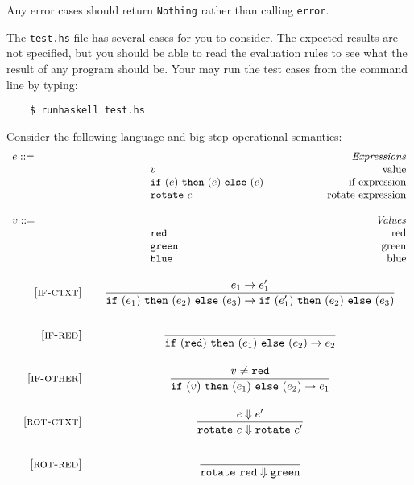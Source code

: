 \documentclass[addpoints]{exam}
\begin{document}
\begin{questions}
Any error cases should return {\tt Nothing} rather than calling {\tt error}.

The {\tt test.hs} file has several cases for you to consider.
The expected results are not specified,
but you should be able to read the evaluation rules to see
what the result of any program should be.
Your may run the test cases from the command line by typing:

\begin{verbatim}
    $ runhaskell test.hs
\end{verbatim}

\eject

  \question[15]

\newcommand{\rval}{\mbox{\tt red}}
\newcommand{\gval}{\mbox{\tt green}}
\newcommand{\bval}{\mbox{\tt blue}}
\newcommand{\rot}[1]{\mbox{\tt rotate}~{#1}}
\newcommand{\ife}[3]{\mbox{\tt if}~({#1})~{\tt then}~({#2})~{\tt else}~({#3})}

Consider the following language and big-step operational semantics:
\[
  \begin{array}{ll@{\qquad\qquad\qquad}r}
  \mydefhead{e ::=}{Expressions}
  \mydefcase{v}{value}
  \mydefcase{\ife e e e}{if expression}
  \mydefcase{\rot e}{rotate expression}
  \\
  \mydefhead{v ::=\qquad\qquad\qquad\qquad}{Values}
  \mydefcase{\rval}{red}
  \mydefcase{\gval}{green}
  \mydefcase{\bval}{blue}
\end{array}
\]

\[
  \begin{array}{r@{\qquad}c}

    \ssrule{if-ctxt}{
      \sstep{e_1}{e_1'} \\
    }{
      \sstep{\ife{e_1}{e_2}{e_3}}{\ife{e_1'}{e_2}{e_3}}
    }

    \ssrule{if-red}{
    }{
      \sstep{\ife{\rval}{e_1}{e_2}}{e_2}
    }

    \ssrule{if-other}{
      v \neq \rval
    }{
      \sstep{\ife{v}{e_1}{e_2}}{e_1}
    }


    \ssrule{rot-ctxt}{
      \bstep{e}{e'}
    }{
      \bstep{\rot e}{\rot {e'}}
    }

    \ssrule{rot-red}{
    }{
      \bstep{\rot \rval}{\gval}
    }


\end{array}\]
\end{questions}
\end{document}
